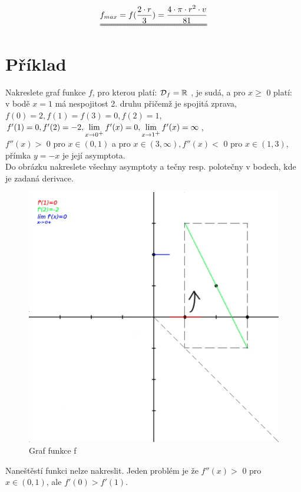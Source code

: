 \documentclass[a4paper, 11pt]{article}
\begin{document}
\begin{enumerate}
\begin{equation}\uuline{f_{max} = f(\frac{2 \cdot r}{3}) = \frac{4 \cdot \pi \cdot r^2 \cdot v}{81}}\end{equation}
\end{enumerate}

\section{Příklad}
Nakreslete graf funkce $ f$, pro kterou platí: $ \mathcal{D}\textsubscript{$f$} = \mathbb{R}$ , je sudá, a pro $x \geq$ 0  platí:\\
v bodě $x = 1$ má nespojitost 2. druhu přičemž je spojitá zprava, \\
$f(0) = 2, f(1) = f(3) = 0, f(2) = 1$,\\
$f'(1) = 0, f'(2) = -2, \lim\limits_{x \to 0\textsuperscript{+}} f'(x) = 0, \lim\limits_{x \to 1\textsuperscript{+}} f'(x) = \infty$,\\
$f''(x) >$ 0 pro $x \in (0,1)$ a pro $x \in (3,\infty), f''(x)  <$ 0 pro $x \in (1,3)$,\\
přímka $y = -x$ je její asymptota.\\
Do obrázku nakreslete všechny asymptoty a tečny resp. polotečny v bodech, kde je zadaná derivace.

\begin{figure}[h!]
	\centering
	\includegraphics[width=0.9\linewidth]{graph.eps}
	\caption{Graf funkce f}
	\label{fig:image}
\end{figure}
Naneštěstí funkci nelze nakreslit. Jeden problém je že $f''(x) >$ 0 pro $x \in (0,1)$, ale $f'(0) > f'(1)$.
\end{document}
